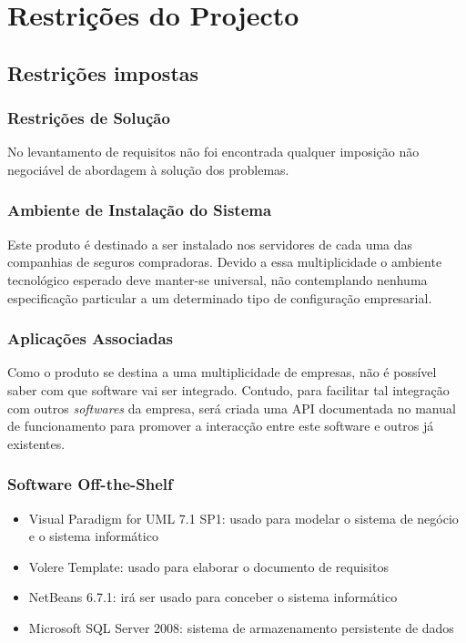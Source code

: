 \chapter{Restrições do Projecto}
\section{Restrições impostas}
\subsection{Restrições de Solução}
No levantamento de requisitos não foi encontrada qualquer imposição não negociável de abordagem à solução dos problemas.

\subsection{Ambiente de Instalação do Sistema}
Este produto é destinado a ser instalado nos servidores de cada uma das companhias de seguros compradoras. Devido a essa multiplicidade o ambiente tecnológico esperado deve manter-se universal, não contemplando nenhuma especificação particular a um determinado tipo de configuração empresarial.

\subsection{Aplicações Associadas}
Como o produto se destina a uma multiplicidade de empresas, não é possível saber com que software vai ser integrado. Contudo, para facilitar tal integração com outros \emph{softwares} da empresa, será criada uma API documentada no manual de funcionamento para promover a interacção entre este software e outros já existentes.

\subsection{Software Off-the-Shelf}
\begin{itemize}
\item Visual Paradigm for UML 7.1 SP1: usado para modelar o sistema de negócio e o sistema informático
\item Volere Template: usado para elaborar o documento de requisitos
\item NetBeans 6.7.1: irá ser usado para conceber o sistema informático
\item Microsoft SQL Server 2008: sistema de armazenamento persistente de dados
\end{itemize}

